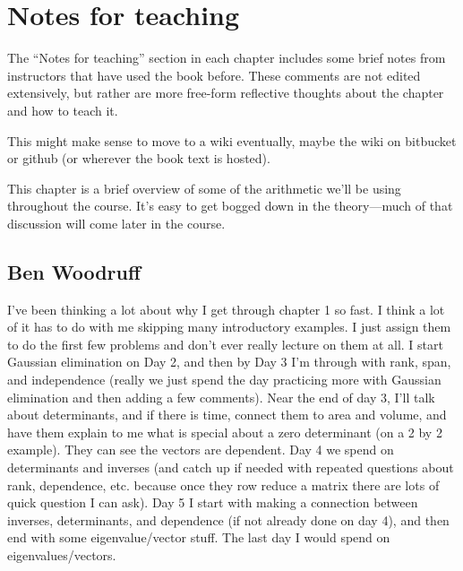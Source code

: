 \section{Notes for teaching}

The ``Notes for teaching'' section in each chapter includes some brief notes from instructors that have used the book before.  These comments are not edited extensively, but rather are more free-form reflective thoughts about the chapter and how to teach it.

This might make sense to move to a wiki eventually, maybe the wiki on bitbucket or github (or wherever the book text is hosted).

This chapter is a brief overview of some of the arithmetic we'll be using throughout the course.  It's easy to get bogged down in the theory---much of that discussion will come later in the course.

\subsection{Ben Woodruff}

I've been thinking a lot about why I get through chapter 1 so fast.  I think a lot of it has to do with me skipping many introductory examples. I just assign them to do the first few problems and don't ever really lecture on them at all. I start Gaussian elimination on Day 2, and then by Day 3 I'm through with rank, span, and independence (really we just spend the day practicing more with Gaussian elimination and then adding a few comments).  Near the end of day 3, I'll talk about determinants, and if there is time, connect them to area and volume, and have them explain to me what is special about a zero determinant (on a 2 by 2 example). They can see the vectors are dependent.  Day 4 we spend on determinants and inverses (and catch up if needed with repeated questions about rank, dependence, etc. because once they row reduce a matrix there are lots of quick question I can ask).  Day 5 I start with making a connection between inverses, determinants, and dependence (if not already done on day 4), and then end with some eigenvalue/vector stuff.  The last day I would spend on eigenvalues/vectors.

